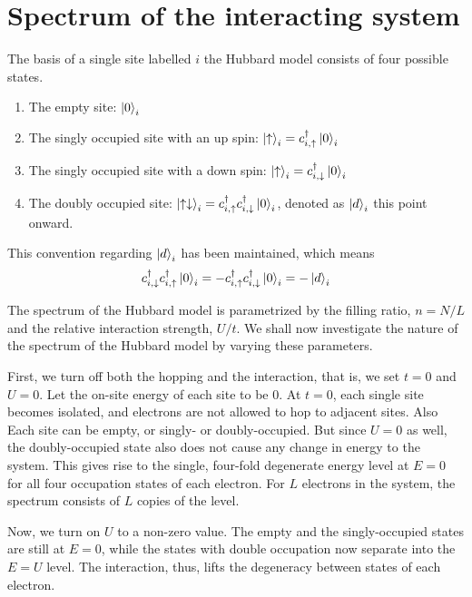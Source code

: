 \documentclass[]{report}
\begin{document}
\section{Spectrum of the interacting system}\label{sec:spectrum}
The basis of a single site labelled $ i $ the Hubbard model consists of four possible states.
\begin{enumerate}
	\item The empty site: $ \ket{0}_i $
	\item The singly occupied site with an up spin: $ \ket{\uparrow}_i = c^{\dagger}_{i, \uparrow} \ket{0}_i$ 
	\item The singly occupied site with a down spin: $ \ket{\uparrow}_i = c^{\dagger}_{i, \downarrow} \ket{0}_i$
	\item The doubly occupied site: $ \ket{\uparrow\downarrow}_i = c^{\dagger}_{i, \uparrow} c^{\dagger}_{i, \downarrow} \ket{0}_i $, denoted as $ \ket{d}_i $ this point onward.
\end{enumerate}

This convention regarding $ \ket{d}_i $ has been maintained, which means
\begin{align}
c^{\dagger}_{i, \downarrow} c^{\dagger}_{i, \uparrow}  \ket{0}_i  = - c^{\dagger}_{i, \uparrow} c^{\dagger}_{i, \downarrow} \ket{0}_i = -\ket{d}_i
\end{align}

The spectrum of the Hubbard model is parametrized by the filling ratio, $ n = N/L $ and the relative interaction strength, $ U/t $. We shall now investigate the nature of the spectrum of the Hubbard model by varying these parameters.

First, we turn off both the hopping and the interaction, that is, we set $ t=0 $ and $ U=0 $. Let the on-site energy of each site to be $ 0$. At $ t=0 $, each single site becomes isolated, and electrons are not allowed to hop to adjacent sites. Also Each site can be empty, or singly- or doubly-occupied. But since $ U=0 $ as well, the doubly-occupied state also does not cause any change in energy to the system. This gives rise to the single, four-fold degenerate energy level at $ E=0 $ for all four occupation states of each electron. For $ L $ electrons in the system, the spectrum consists of $ L $ copies of the level.

Now, we turn on $ U $ to a non-zero value. The empty and the singly-occupied states are still at $ E = 0 $, while the states with double occupation now separate into the $ E = U $ level. The interaction, thus, lifts the degeneracy between states of each electron.
\end{document}
